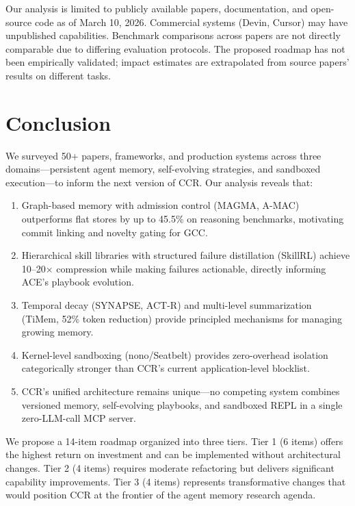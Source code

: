 \documentclass[11pt]{article}
\begin{document}
Our analysis is limited to publicly available papers, documentation, and open-source code as of March 10, 2026. Commercial systems (Devin, Cursor) may have unpublished capabilities. Benchmark comparisons across papers are not directly comparable due to differing evaluation protocols. The proposed roadmap has not been empirically validated; impact estimates are extrapolated from source papers' results on different tasks.

\section{Conclusion}
\label{sec:conclusion}

We surveyed 50+ papers, frameworks, and production systems across three domains---persistent agent memory, self-evolving strategies, and sandboxed execution---to inform the next version of CCR. Our analysis reveals that:

\begin{enumerate}[leftmargin=*]
    \item Graph-based memory with admission control (MAGMA, A-MAC) outperforms flat stores by up to 45.5\% on reasoning benchmarks, motivating commit linking and novelty gating for GCC.
    \item Hierarchical skill libraries with structured failure distillation (SkillRL) achieve 10--20$\times$ compression while making failures actionable, directly informing ACE's playbook evolution.
    \item Temporal decay (SYNAPSE, ACT-R) and multi-level summarization (TiMem, 52\% token reduction) provide principled mechanisms for managing growing memory.
    \item Kernel-level sandboxing (nono/Seatbelt) provides zero-overhead isolation categorically stronger than CCR's current application-level blocklist.
    \item CCR's unified architecture remains unique---no competing system combines versioned memory, self-evolving playbooks, and sandboxed REPL in a single zero-LLM-call MCP server.
\end{enumerate}

We propose a 14-item roadmap organized into three tiers. Tier 1 (6 items) offers the highest return on investment and can be implemented without architectural changes. Tier 2 (4 items) requires moderate refactoring but delivers significant capability improvements. Tier 3 (4 items) represents transformative changes that would position CCR at the frontier of the agent memory research agenda.
\end{document}
